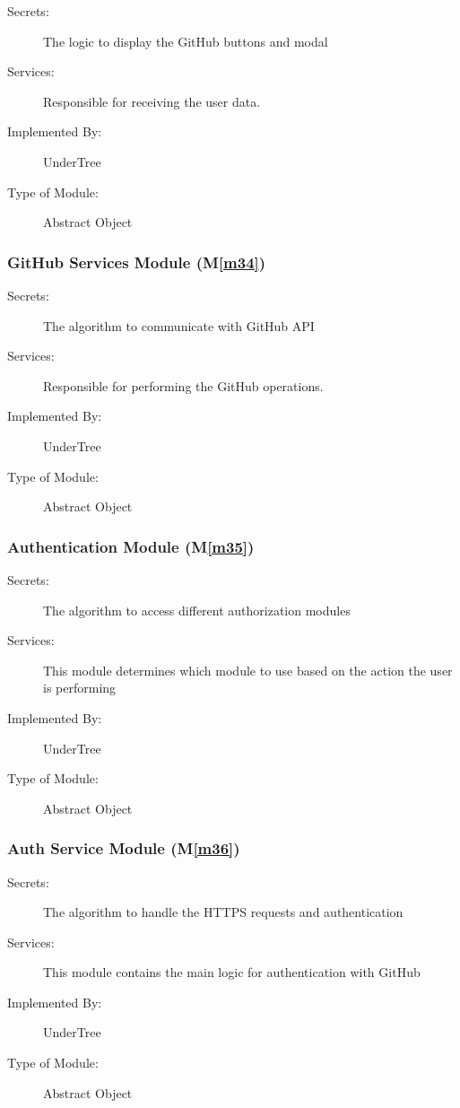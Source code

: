 \documentclass[12pt, titlepage]{article}
\newcommand{\mref}[1]{M\ref{#1}}
\begin{document}
	\begin{description}
		\item[Secrets:] The logic to display the GitHub buttons and modal
		\item[Services:] Responsible for receiving the user data.
		\item[Implemented By:] UnderTree
		\item[Type of Module:] Abstract Object
	\end{description}
	
	\subsubsection{GitHub Services Module (\mref{m34})}
	
	\begin{description}
		\item[Secrets:] The algorithm to communicate with GitHub API
		\item[Services:] Responsible for performing the GitHub operations.
		\item[Implemented By:] UnderTree
		\item[Type of Module:] Abstract Object
	\end{description}
	
	\subsubsection{Authentication Module (\mref{m35})}
	
	\begin{description}
		\item[Secrets:] The algorithm to access different authorization modules
		\item[Services:] This module determines which module to use based on the action the user is performing
		\item[Implemented By:] UnderTree
		\item[Type of Module:] Abstract Object
	\end{description}
	
	\subsubsection{Auth Service Module (\mref{m36})}
	
	\begin{description}
		\item[Secrets:] The algorithm to handle the HTTPS requests and authentication
		\item[Services:] This module contains the main logic for authentication with GitHub
		\item[Implemented By:] UnderTree
		\item[Type of Module:] Abstract Object
	\end{description}
	
\end{document}
